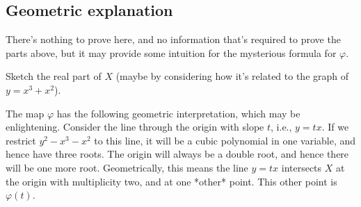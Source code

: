 \documentclass{amsart}[12pt]
\begin{document}
\subsection*{Geometric explanation}
There's nothing to prove here, and no information that's required to prove the parts above, but it may provide some intuition for the mysterious formula for $\varphi$.

Sketch the real part of $X$ (maybe by considering how it's related to the graph of $y=x^3+x^2$).

The map $\varphi$ has the following geometric interpretation, which may be enlightening.  Consider the line through the origin with slope $t$, i.e., $y=tx$.  If we restrict $y^2-x^3-x^2$ to this line, it will be a cubic polynomial in one variable, and hence have three roots.  The origin will always be a double root, and hence there will be one more root.  Geometrically, this means the line $y=tx$ intersects $X$ at the origin with multiplicity two, and at one *other* point.  This other point is $\varphi(t)$.  
\end{document}

